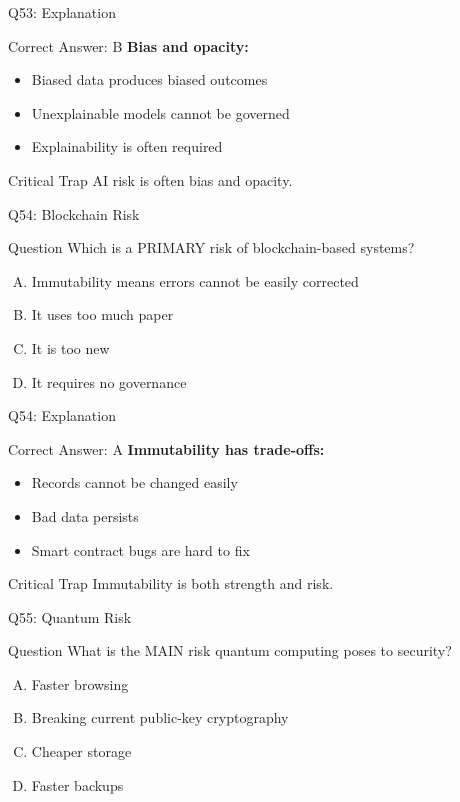 \documentclass{beamer}
\begin{document}
	\begin{frame}{Q53: Explanation}
		\begin{block}{Correct Answer: B}
			\textbf{Bias and opacity:}
			\begin{itemize}
				\item Biased data produces biased outcomes
				\item Unexplainable models cannot be governed
				\item Explainability is often required
			\end{itemize}
		\end{block}
		\begin{alertblock}{Critical Trap}
			AI risk is often bias and opacity.
		\end{alertblock}
	\end{frame}
	
	\begin{frame}{Q54: Blockchain Risk}
		\begin{block}{Question}
			Which is a PRIMARY risk of blockchain-based systems?
		\end{block}
		\begin{enumerate}[(A)]
			\item Immutability means errors cannot be easily corrected
			\item It uses too much paper
			\item It is too new
			\item It requires no governance
		\end{enumerate}
	\end{frame}
	
	\begin{frame}{Q54: Explanation}
		\begin{block}{Correct Answer: A}
			\textbf{Immutability has trade-offs:}
			\begin{itemize}
				\item Records cannot be changed easily
				\item Bad data persists
				\item Smart contract bugs are hard to fix
			\end{itemize}
		\end{block}
		\begin{alertblock}{Critical Trap}
			Immutability is both strength and risk.
		\end{alertblock}
	\end{frame}
	
	\begin{frame}{Q55: Quantum Risk}
		\begin{block}{Question}
			What is the MAIN risk quantum computing poses to security?
		\end{block}
		\begin{enumerate}[(A)]
			\item Faster browsing
			\item Breaking current public-key cryptography
			\item Cheaper storage
			\item Faster backups
		\end{enumerate}
	\end{frame}
	
\end{document}
